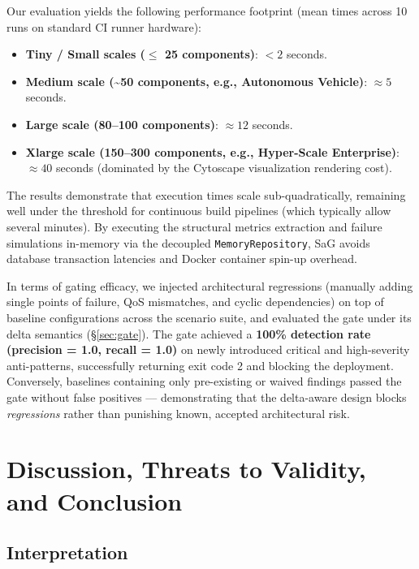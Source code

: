\documentclass[review]{elsarticle}
\begin{document}
Our evaluation yields the following performance footprint (mean times across 10 runs on standard CI
runner hardware):
\begin{itemize}
\item \textbf{Tiny / Small scales ($\le$ 25 components)}: $< 2$ seconds.
\item \textbf{Medium scale (\textasciitilde50 components, e.g., Autonomous Vehicle)}: $\approx 5$
  seconds.
\item \textbf{Large scale (80--100 components)}: $\approx 12$ seconds.
\item \textbf{Xlarge scale (150--300 components, e.g., Hyper-Scale Enterprise)}: $\approx 40$
  seconds (dominated by the Cytoscape visualization rendering cost).
\end{itemize}

The results demonstrate that execution times scale sub-quadratically, remaining well under the
threshold for continuous build pipelines (which typically allow several minutes). By executing the
structural metrics extraction and failure simulations in-memory via the decoupled
\texttt{MemoryRepository}, SaG avoids database transaction latencies and Docker container spin-up
overhead.

In terms of gating efficacy, we injected architectural regressions (manually adding single points of
failure, QoS mismatches, and cyclic dependencies) on top of baseline configurations across the
scenario suite, and evaluated the gate under its delta semantics (\S\ref{sec:gate}). The gate
achieved a \textbf{100\% detection rate (precision = 1.0, recall = 1.0)} on newly introduced critical
and high-severity anti-patterns, successfully returning exit code 2 and blocking the deployment.
Conversely, baselines containing only pre-existing or waived findings passed the gate without false
positives --- demonstrating that the delta-aware design blocks \emph{regressions} rather than
punishing known, accepted architectural risk.

\section{Discussion, Threats to Validity, and Conclusion}
\label{sec:discussion}

\subsection{Interpretation}
\end{document}

